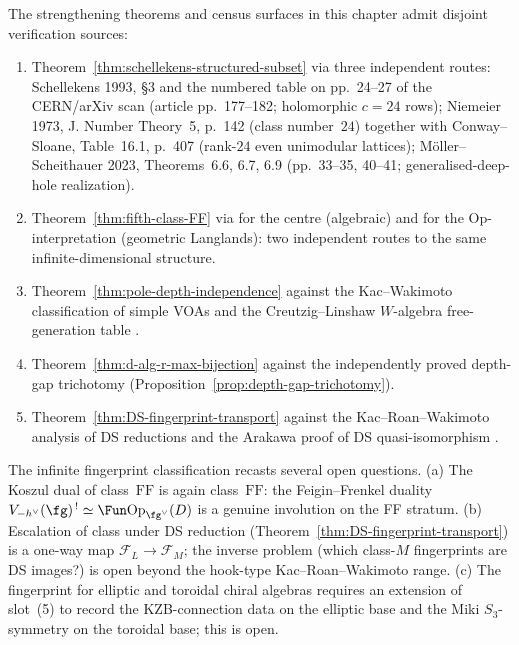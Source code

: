 \begin{remark}
\label{rem:fingerprint-iv-paths}
The strengthening theorems and census surfaces in this chapter admit
disjoint verification sources:
\begin{enumerate}[label=\textup{(\alph*)},leftmargin=*]
\item Theorem~\ref{thm:schellekens-structured-subset} via three
 independent routes: Schellekens 1993, §3 and the numbered table on
 pp.~24--27 of the CERN/arXiv scan \textup{(}article pp.~177--182;
 holomorphic $c=24$ rows\textup{)}; Niemeier 1973, J. Number Theory~5, p.~142
 \textup{(}class number~$24$\textup{)} together with Conway--Sloane,
 Table~16.1, p.~407 \textup{(}rank-$24$ even unimodular lattices\textup{)};
 M\"oller--Scheithauer 2023, Theorems~6.6, 6.7, 6.9
 \textup{(}pp.~33--35, 40--41; generalised-deep-hole realization\textup{)}.
\item Theorem~\ref{thm:fifth-class-FF} via
 \cite{FeiginFrenkel1992} for the centre
 (algebraic) and \cite{BeilinsonDrinfeld1991} for the
 $\mathrm{Op}$-interpretation (geometric Langlands): two independent
 routes to the same infinite-dimensional structure.
\item Theorem~\ref{thm:pole-depth-independence} against the
Kac--Wakimoto classification of simple VOAs
\cite{KacWakimoto2004} and the Creutzig--Linshaw $W$-algebra
free-generation table \cite{CreutzigLinshaw2023}.
\item Theorem~\ref{thm:d-alg-r-max-bijection} against the
independently proved depth-gap trichotomy
\textup{(}Proposition~\ref{prop:depth-gap-trichotomy}\textup{)}.
\item Theorem~\ref{thm:DS-fingerprint-transport} against the
Kac--Roan--Wakimoto analysis of DS reductions
\cite{KacRoanWakimoto2003} and the Arakawa proof of DS quasi-isomorphism
\cite{Arakawa2007}.
\end{enumerate}
\end{remark}

\begin{remark}
\label{rem:fingerprint-forward-consequences}
The infinite fingerprint classification recasts several open
questions. (a) The Koszul dual of class~$\mathrm{FF}$ is again
class~$\mathrm{FF}$: the Feigin--Frenkel duality
$V_{-h^\vee}(\fg)^{\,!} \simeq \Fun\mathrm{Op}_{\fg^\vee}(D)$
is a genuine involution on the FF stratum. (b) Escalation of class
under DS reduction
(Theorem~\ref{thm:DS-fingerprint-transport}) is a one-way map
$\mathcal{F}_L\to\mathcal{F}_M$; the inverse problem (which class-$M$
fingerprints are DS images?) is open beyond the hook-type
Kac--Roan--Wakimoto range. (c) The fingerprint for elliptic and
toroidal chiral algebras requires an extension of slot~(5) to record
the KZB-connection data on the elliptic base and the Miki
$S_3$-symmetry on the toroidal base; this is open.
\end{remark}

